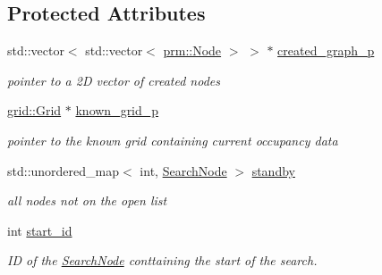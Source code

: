 \subsection*{Protected Attributes}
\begin{DoxyCompactItemize}
\item 
\mbox{\label{classhsearch_1_1LPAStar_a75e7bdc0841fd31468c41a58ac842aed}} 
std\+::vector$<$ std\+::vector$<$ \hyperlink{structprm_1_1Node}{prm\+::\+Node} $>$ $>$ $\ast$ \hyperlink{classhsearch_1_1LPAStar_a75e7bdc0841fd31468c41a58ac842aed}{created\+\_\+graph\+\_\+p}
\begin{DoxyCompactList}\small\item\em pointer to a 2D vector of created nodes \end{DoxyCompactList}\item 
\mbox{\label{classhsearch_1_1LPAStar_ad96878a72794979745566de57b9a361d}} 
\hyperlink{classgrid_1_1Grid}{grid\+::\+Grid} $\ast$ \hyperlink{classhsearch_1_1LPAStar_ad96878a72794979745566de57b9a361d}{known\+\_\+grid\+\_\+p}
\begin{DoxyCompactList}\small\item\em pointer to the known grid containing current occupancy data \end{DoxyCompactList}\item 
\mbox{\label{classhsearch_1_1LPAStar_afb7587e07b8f73ecc5edef922924d1bf}} 
std\+::unordered\+\_\+map$<$ int, \hyperlink{structhsearch_1_1SearchNode}{Search\+Node} $>$ \hyperlink{classhsearch_1_1LPAStar_afb7587e07b8f73ecc5edef922924d1bf}{standby}
\begin{DoxyCompactList}\small\item\em all nodes not on the open list \end{DoxyCompactList}\item 
\mbox{\label{classhsearch_1_1LPAStar_a58cdedcd572ecccbddb30e5d0fc4deab}} 
int \hyperlink{classhsearch_1_1LPAStar_a58cdedcd572ecccbddb30e5d0fc4deab}{start\+\_\+id}
\begin{DoxyCompactList}\small\item\em ID of the \hyperlink{structhsearch_1_1SearchNode}{Search\+Node} conttaining the start of the search. \end{DoxyCompactList}\item 

\end{DoxyCompactItemize}
